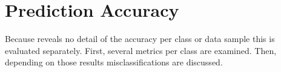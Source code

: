 \section{Prediction Accuracy}
\label{sec:results-predictions}
Because  reveals no detail of the accuracy per class or data sample this is evaluated separately.
First, several metrics per class are examined.
Then, depending on those results misclassifications are discussed.


